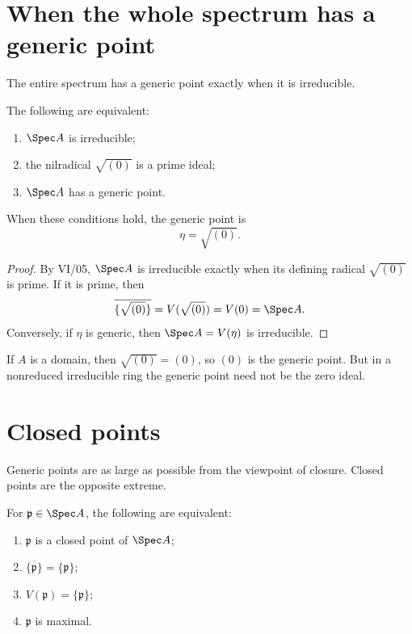 \section{When the whole spectrum has a generic point}

The entire spectrum has a generic point exactly when it is irreducible.

\begin{theorem}
The following are equivalent:
\begin{enumerate}
\item $\Spec A$ is irreducible;
\item the nilradical $\sqrt{(0)}$ is a prime ideal;
\item $\Spec A$ has a generic point.
\end{enumerate}
When these conditions hold, the generic point is
\[
\eta=\sqrt{(0)}.
\]
\end{theorem}

\begin{proof}
By VI/05, $\Spec A$ is irreducible exactly when its defining radical
$\sqrt{(0)}$ is prime.  If it is prime, then
\[
\overline{\{\sqrt{(0)}\}}=V(\sqrt{(0)})=V(0)=\Spec A.
\]
Conversely, if $\eta$ is generic, then $\Spec A=V(\eta)$ is irreducible.
\end{proof}

If $A$ is a domain, then $\sqrt{(0)}=(0)$, so $(0)$ is the generic point.  But in a
nonreduced irreducible ring the generic point need not be the zero ideal.



\section{Closed points}

Generic points are as large as possible from the viewpoint of closure.  Closed points are
the opposite extreme.

\begin{theorem}
For $\mathfrak p\in\Spec A$, the following are equivalent:
\begin{enumerate}
\item $\mathfrak p$ is a closed point of $\Spec A$;
\item $\overline{\{\mathfrak p\}}=\{\mathfrak p\}$;
\item $V(\mathfrak p)=\{\mathfrak p\}$;
\item $\mathfrak p$ is maximal.
\end{enumerate}
\end{theorem}

